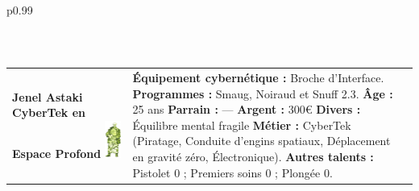 \documentclass[11pt,twoside,a4paper]{article}
\begin{document}
\begin{longtable}[ht]{ p{} }
\begin{tabular}[h]{ p{} p{} p{} }
	\end{tabular} \newline \\
	
		\hline
	\begin{tabular}[h]{ p{} p{} p{} }
		\textbf{Jenel Astaki}										\newline
		\textbf{\small CyberTek en Espace Profond}					\newline
			\newline
		\includegraphics[width=0.15\textwidth]{img/personnageJenelAstaki.jpg}		
			\newline
			
		& %
			
		\textbf{{\'E}quipement cybern{\'e}tique : }Broche d'Interface.	\newline
		\textbf{Programmes : }Smaug, Noiraud et Snuff 2.3.				\newline
		\textbf{{\^A}ge : } 25 ans 										\newline
		\textbf{Parrain : } --- 										\newline
		\textbf{Argent : } 300\euro 									\newline
		\textbf{Divers : } {\'E}quilibre mental fragile					\newline
		\textbf{M{\'e}tier : } CyberTek (Piratage, Conduite d'engins spatiaux, D{\'e}placement en gravit{\'e} z{\'e}ro, {\'E}lectronique). \newline
		\textbf{Autres talents : } Pistolet 0 ; Premiers soins 0  ; Plong{\'e}e 0. \newline
		

\end{tabular}
\end{longtable}
\end{document}
